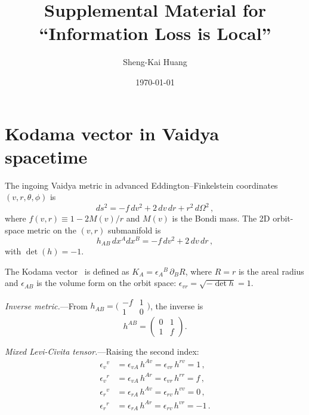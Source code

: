 \documentclass[prl,twocolumn,superscriptaddress,longbibliography,floatfix]{revtex4-2}
\begin{document}
\title{Supplemental Material for ``Information Loss is Local''}

\author{Sheng-Kai Huang}

\date{\today}

\maketitle

\section{Kodama vector in Vaidya spacetime}
\label{sec:kodama_derivation}

The ingoing Vaidya metric in advanced
Eddington--Finkelstein coordinates $(v,r,\theta,\phi)$ is
\begin{equation}
  ds^2 = -f\,dv^2 + 2\,dv\,dr + r^2\,d\Omega^2\,,
  \label{eq:vaidya}
\end{equation}
where $f(v,r) \equiv 1 - 2M(v)/r$ and $M(v)$ is the
Bondi mass.
The 2D orbit-space metric on the $(v,r)$ submanifold is
\begin{equation}
  h_{AB}\,dx^A dx^B = -f\,dv^2 + 2\,dv\,dr\,,
  \label{eq:h2d}
\end{equation}
with $\det(h) = -1$.

The Kodama vector~\cite{Kodama1980} is defined as
$K_A = \epsilon_A{}^B\,\partial_B R$, where $R = r$ is
the areal radius and $\epsilon_{AB}$ is the volume form
on the orbit space: $\epsilon_{vr} = \sqrt{-\det h} = 1$.

\emph{Inverse metric.}---From
$h_{AB} = \bigl(\begin{smallmatrix} -f & 1 \\ 1 & 0
\end{smallmatrix}\bigr)$, the inverse is
\begin{equation}
  h^{AB} = \begin{pmatrix} 0 & 1 \\ 1 & f \end{pmatrix}.
  \label{eq:hinv}
\end{equation}

\emph{Mixed Levi-Civita tensor.}---Raising the second index:
\begin{align}
  \epsilon_v{}^v &= \epsilon_{vA}\,h^{Av}
    = \epsilon_{vr}\,h^{rv} = 1\,,
  \label{eq:eps1}\\
  \epsilon_v{}^r &= \epsilon_{vA}\,h^{Ar}
    = \epsilon_{vr}\,h^{rr} = f\,,
  \label{eq:eps2}\\
  \epsilon_r{}^v &= \epsilon_{rA}\,h^{Av}
    = \epsilon_{rv}\,h^{vv} = 0\,,
  \label{eq:eps3}\\
  \epsilon_r{}^r &= \epsilon_{rA}\,h^{Ar}
    = \epsilon_{rv}\,h^{vr} = -1\,.
  \label{eq:eps4}
\end{align}
\end{document}
